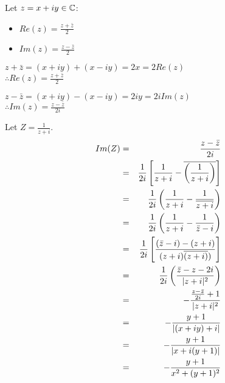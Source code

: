 \documentclass[letterpaper,12pt,fleqn]{article}
\newcommand{\conj}[1]{\bar{#1}}
\newcommand{\Conj}[1]{\overline{#1}}
\begin{document}
\newpage

\begin{theorem}
Let $z=x+iy\in\mathbb{C}$:
\begin{itemize}
\item{$Re(z)=\frac{z+\conj{z}}{2}$}
\item{$Im(z)=\frac{z-\conj{z}}{2}$}
\end{itemize}
\end{theorem}

\begin{theproof}
$z+\conj{z}=(x+iy)+(x-iy)=2x=2Re(z)$ \\
$\therefore Re(z)=\frac{z+\conj{z}}{2}$

$z-\conj{z}=(x+iy)-(x-iy)=2iy=2iIm(z)$ \\
$\therefore Im(z)=\frac{z-\conj{z}}{2i}$
\end{theproof}

\begin{example}
Let $Z=\frac{1}{z+i}$.
\begin{eqnarray*}
Im(Z) &=& \frac{z-\conj{z}}{2i} \\
    &=& \frac{1}{2i}\left[\frac{1}{z+i}-
        \Conj{\left(\frac{1}{z+i}\right)}\right] \\
    &=& \frac{1}{2i}\left(\frac{1}{z+i}-\frac{1}{\Conj{z+i}}\right) \\
    &=& \frac{1}{2i}\left(\frac{1}{z+i}-\frac{1}{\conj{z}-i}\right) \\
    &=& \frac{1}{2i}\left[\frac{(\conj{z}-i)-(z+i)}
        {(z+i)\Conj{(z+i)})}\right] \\
    &=& \frac{1}{2i}\left(\frac{\conj{z}-z-2i}{\abs{z+i}^2}\right) \\
    &=& -\frac{\frac{z-\conj{z}}{2i}+1}{\abs{z+i}^2} \\
    &=& -\frac{y+1}{\abs{(x+iy)+i}} \\
    &=& -\frac{y+1}{\abs{x+i(y+1)}} \\
    &=& -\frac{y+1}{x^2+(y+1)^2} \\
\end{eqnarray*}
\end{example}
\end{document}
